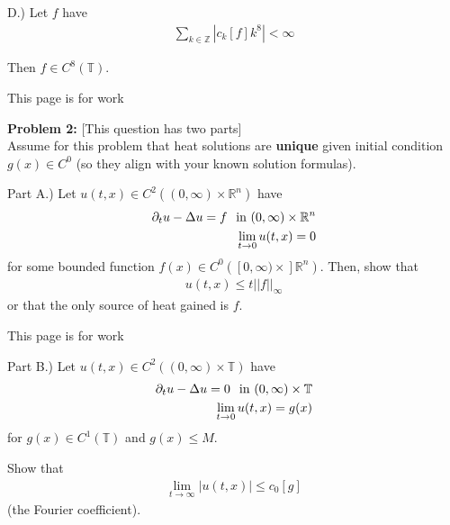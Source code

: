 \documentclass{article}
\newcommand{\Z}{{\mathbb{Z}}}
\newcommand{\R}{{\mathbb{R}}}
\newcommand{ \norm }[1]{{ || {#1}||}}
\newcommand{\pd}{\partial}
\begin{document}
\vspace{3 cm}
D.) Let $f$ have 
\begin{align*}
	\sum_{k \in \Z} |c_{k}[f]k^{8}| < \infty 
\end{align*}

Then $f \in C^{8}(\mathbb{T})$. 


\newpage

This page is for work
\newpage



\textbf{Problem 2:} [This question has two parts]\\

Assume for this problem that heat solutions are \textbf{unique} given initial condition $g(x) \in C^{0}$ (so they align with your known solution formulas). 

\vspace{1 cm}

Part A.) Let $u(t,x) \in C^{2}((0,\infty) \times \R^{n})$ have 
\begin{align*}
	\pd_{t}u - \Delta u =f \hspace{0.25 cm} \text{in } (0,\infty) \times \R^{n}\\
	\lim_{t \to 0 } u(t,x) = 0
\end{align*}
for some bounded function $f(x) \in C^{0}([0,\infty) \times ]\R^{n})$. Then, show that 
\begin{align*}
	 u(t,x) \leq t\norm{f}_{\infty} 
\end{align*}
or that the only source of heat gained is $f$.



\newpage

This page is for work
\newpage

Part B.) Let $u(t,x) \in C^{2}((0,\infty) \times \mathbb{T})$ have 
\begin{align*}
	\pd_{t}u - \Delta u =0 \hspace{0.25 cm} \text{in } (0,\infty) \times \mathbb{T}\\
	\lim_{t \to 0 } u(t,x) = g(x)
\end{align*}
for $g(x) \in C^{1}(\mathbb{T})$ and $g(x) \leq M$. 

Show that 
\begin{align*}
	\lim_{t \to \infty} |u(t,x)| \leq c_{0}[g]
\end{align*}
(the Fourier coefficient). 

 




\newpage
\end{document}
